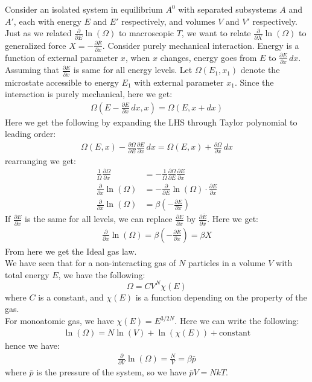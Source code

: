 \documentclass[11pt]{article}
\theoremstyle{break}
\theoremstyle{break}
\newcommand{\lr}[1]{\left( #1 \right)}
\begin{document}
Consider an isolated system in equilibrium $A^0$ with separated subsystems $A$ and $A'$, each with energy $E$ and $E'$ respectively, and volumes $V$ and $V'$ respectively. Just as we related $\frac{\partial }{\partial E}\ln (\Omega)$ to macroscopic $T$, we want to relate $\frac{\partial}{\partial X}\ln(\Omega)$ to generalized force $X = -\frac{\partial \bar{E}}{\partial x}$. Consider purely mechanical interaction. Energy is a function of external parameter $x$, when $x$ changes, energy goes from $E$ to $\frac{\partial E}{\partial x} \, dx$. Assuming that $\frac{\partial E}{\partial x}$ is same for all energy levels. Let $\Omega(E_1,x_1)$ denote the microstate accessible to energy $E_1$ with external parameter $x_1$. Since the interaction is purely mechanical, here we get:
\begin{align*}
\Omega\lr{E- \frac{\partial E}{\partial x}\, dx, x} = \Omega(E, x + dx)
\end{align*}  
Here we get the following by expanding the LHS through Taylor polynomial to leading order:
\begin{align*}
\Omega(E, x) - \frac{\partial \Omega}{\partial E} \frac{\partial E}{\partial x}\, dx = \Omega(E,x) + \frac{\partial\Omega}{\partial x}\, dx
\end{align*}
rearranging we get:
\begin{align*}
\frac{1}{\Omega}\frac{\partial \Omega}{\partial x} &= -\frac{1}{\Omega}\frac{\partial \Omega}{\partial E}\frac{\partial E}{\partial x}\\
\frac{\partial }{\partial x}\ln(\Omega) &= - \frac{\partial }{\partial E}\ln(\Omega) \cdot \frac{\partial E}{\partial x}\\
\frac{\partial}{\partial x}\ln(\Omega)&= \beta\left(-\frac{\partial E}{\partial x}\right)
\end{align*}
If $\frac{\partial E}{\partial x}$ is the same for all levels, we can replace $\frac{\partial E}{\partial x}$ by $\frac{\partial \bar{E}}{\partial x}$. 
Here we get:
\begin{align*}
\frac{\partial}{\partial x}\ln (\Omega) = \beta\left(-\frac{\partial\bar{E}}{\partial x}\right) = \beta X
\end{align*}
From here we get the Ideal gas law.\\

We have seen that for a non-interacting gas of $N$ particles in a volume $V$ with total energy $E$, we have the following:
$$\Omega = C V^N \chi (E)$$
where $C$ is a constant, and $\chi (E)$ is a function depending on the property of the gas. \\
For monoatomic gas, we have $\chi(E) = E^{3/2 N}$. Here we can write the following:
\begin{align*}
\ln (\Omega) = N\ln (V) + \ln (\chi(E)) + \text{constant}
\end{align*}
hence we have:
\begin{align*}
\frac{\partial}{\partial V}\ln(\Omega) = \frac{N}{V} = \beta \bar{p}
\end{align*}
where $\bar{p}$ is the pressure of the system, so we have $\bar{p}V = NkT$. \\
\end{document}
